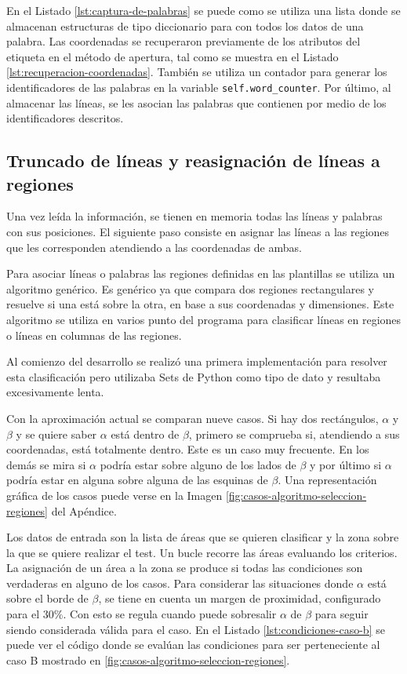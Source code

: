 En el Listado \ref{lst:captura-de-palabras} se puede como se utiliza una lista donde se almacenan estructuras de tipo diccionario para con todos los datos de una palabra. Las coordenadas se recuperaron previamente de los atributos del etiqueta en el método de apertura, tal como se muestra en el Listado \ref{lst:recuperacion-coordenadas}. También se utiliza un contador para generar los identificadores de las palabras en la variable \verb|self.word_counter|. Por último, al almacenar las líneas, se les asocian las palabras que contienen por medio de los identificadores descritos. 

\subsection{Truncado de líneas y reasignación de líneas a regiones}

Una vez leída la información, se tienen en memoria todas las líneas y palabras con sus posiciones. El siguiente paso consiste en asignar las líneas a las regiones que les corresponden atendiendo a las coordenadas de ambas.

Para asociar líneas o palabras las regiones definidas en las plantillas se utiliza un algoritmo genérico. Es genérico ya que compara dos regiones rectangulares y resuelve si una está sobre la otra, en base a sus coordenadas y dimensiones. Este algoritmo se utiliza en varios punto del programa para clasificar líneas en regiones o líneas en columnas de las regiones.

Al comienzo del desarrollo se realizó una primera implementación para resolver esta clasificación pero utilizaba Sets de Python como tipo de dato y resultaba excesivamente lenta. 

Con la aproximación actual se comparan nueve casos. Si hay dos rectángulos, $ \alpha $ y $ \beta $ y se quiere saber $ \alpha $ está dentro de $ \beta $, primero se comprueba si, atendiendo a sus coordenadas, está totalmente dentro. Este es un caso muy frecuente. En los demás se mira si $ \alpha $ podría estar sobre alguno de los lados de $ \beta $ y por último si $ \alpha $ podría estar en alguna sobre alguna de las esquinas de $ \beta $. Una representación gráfica de los casos puede verse en la Imagen \ref{fig:casos-algoritmo-seleccion-regiones} del Apéndice. 

Los datos de entrada son la lista de áreas que se quieren clasificar y la zona sobre la que se quiere realizar el test. Un bucle recorre las áreas evaluando los criterios. La asignación de un área a la zona se produce si todas las condiciones son verdaderas en alguno de los casos. Para considerar las situaciones donde $ \alpha $ está sobre el borde de $ \beta $, se tiene en cuenta un margen de proximidad, configurado para el $ 30\% $. Con esto se regula cuando puede sobresalir $ \alpha $ de $ \beta $ para seguir siendo considerada válida para el caso. En el Listado \ref{lst:condiciones-caso-b} se puede ver el código donde se evalúan las condiciones para ser perteneciente al caso B mostrado en \ref{fig:casos-algoritmo-seleccion-regiones}.

